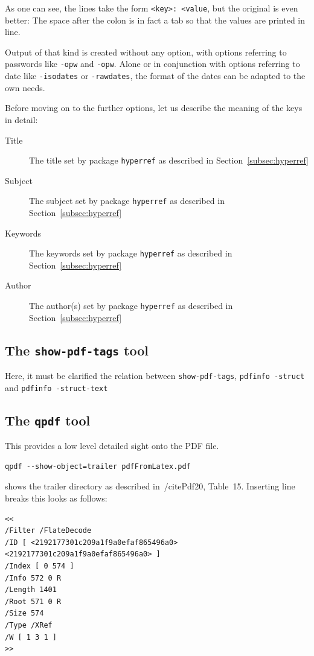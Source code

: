 \documentclass[a4paper, USenglish]{article}%
\begin{document}

As one can see, the lines take the form \texttt{<key>: <value}, 
but the original is even better: The space after the colon is in fact a tab 
so that the values are printed in line. 

Output of that kind is created without any option, with options referring to passwords like \texttt{-opw} and \texttt{-opw}. 
Alone or in conjunction with options referring to date like \texttt{-isodates} or \texttt{-rawdates}, 
the format of the dates can be adapted to the own needs. 

Before moving on to the further options, 
let us describe the meaning of the keys in detail: 
%
\begin{description}
\item[Title] The title set by package \texttt{hyperref} as described in Section~\ref{subsec:hyperref}
\item[Subject] The subject set by package \texttt{hyperref} as described in Section~\ref{subsec:hyperref}
\item[Keywords] The keywords set by package \texttt{hyperref} as described in Section~\ref{subsec:hyperref}
\item[Author] The author(s) set by package \texttt{hyperref} as described in Section~\ref{subsec:hyperref}
\end{description}





\subsection{The \texttt{show-pdf-tags} tool}\label{subsec:pdfAnaShowTags}

Here, it must be clarified the relation between \texttt{show-pdf-tags}, \texttt{pdfinfo -struct} and \texttt{pdfinfo -struct-text}

\subsection{The \texttt{qpdf} tool}\label{subsec:pdfAnaQpdf}

This provides a low level detailed sight onto the PDF file. 
%
\begin{Verbatim}
qpdf --show-object=trailer pdfFromLatex.pdf 
\end{Verbatim}
%
shows the trailer directory as described in~/cite{Pdf20}, Table~15. 
Inserting line breaks this looks as follows: 
%
\begin{Verbatim}
<< 
/Filter /FlateDecode 
/ID [ <2192177301c209a1f9a0efaf865496a0> <2192177301c209a1f9a0efaf865496a0> ] 
/Index [ 0 574 ] 
/Info 572 0 R 
/Length 1401 
/Root 571 0 R 
/Size 574 
/Type /XRef 
/W [ 1 3 1 ] 
>>
\end{Verbatim}
\end{document}
